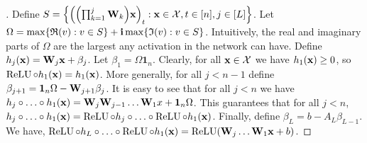 \begin{proof}[]
Define $S = \left\{ \left(\left(\prod_{k=1}^{j} \Wmat_{k} \right) \xvec \right)_{t}: \xvec \in \mathcal{X}, t \in [n], j \in [L] \right\}$.
Let $\Omega = \max\left\{ \mathfrak{R}(v): v \in S \right\} + \ci \max\left\{ \mathfrak{I}(v):v \in S \right\}$.
Intuitively, the real and imaginary parts of $\Omega$ are the largest any activation in the network can have.
Define $h_{j}(\mathbf{x}) = \mathbf{W}_{j}\mathbf{x} + \beta_{j}$. Let $\beta_{1} = \Omega \mathbf{1}_{n}$.
Clearly, for all $\mathbf{x} \in \mathcal{X}$ we have $h_{1}(\mathbf{x})\ge0$, so $\operatorname{ReLU} \circ h_{1}(\mathbf{x}) = h_{1}(\mathbf{x})$.
More generally, for all $j < n-1$ define $\beta_{j+1} = \mathbf{1}_{n} \Omega - \mathbf{W}_{j+1} \beta_{j}$.
It is easy to see that for all $j < n$ we have $h_{j} \circ \ldots \circ h_{1}(\mathbf{x}) = \mathbf{W}_{j}\mathbf{W}_{j-1} \ldots \mathbf{W}_{1}x + \mathbf{1}_{n} \Omega$.
This guarantees that for all $j < n$, $h_{j} \circ \ldots \circ h_{1}(\mathbf{x}) = \operatorname{ReLU} \circ h_{j} \circ \ldots \circ \operatorname{ReLU} \circ h_{1}(\mathbf{x})$.
Finally, define $\beta_{L} = b - A_{L} \beta_{L-1}$.
We have, $\relu \circ h_{L} \circ \ldots \circ \relu \circ h_{1}(\xvec) = \relu \left(\Wmat_{j} \ldots \Wmat_{1} \xvec + b \right)$. 
\end{proof}
%
%


